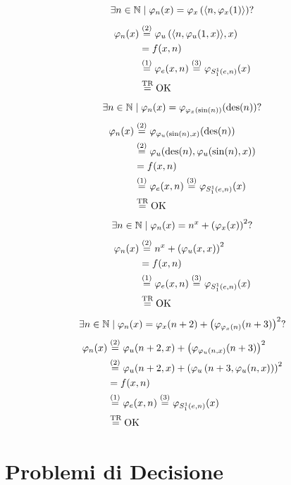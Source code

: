 $$ \exists n \in \mathbb{N} \mid \varphi_n (x) = \varphi_x \left(\langle n, \varphi_x (1) \rangle \right) ?$$
\begin{align*}
	\varphi_n (x) & \stackrel{(2)}{=} \varphi_u \left(\langle n, \varphi_u (1, x) \rangle, x\right) \\
	& = f(x,n) \\
	& \stackrel{(1)}{=} \varphi_e (x,n) \stackrel{(3)}{=} \varphi_{S_1^1 (e,n)} (x) \\
	& \stackrel{\text{TR}}{=} \text{OK}
\end{align*}
$$ \exists n \in \mathbb{N} \mid \varphi_n (x) = \varphi_{\varphi_x (\sin (n))} (\operatorname{des} (n)) ? $$
\begin{align*}
	\varphi_n (x) & \stackrel{(2)}{=} \varphi_{\varphi_u (\sin (n), x)} (\operatorname{des} (n)) \\
	& \stackrel{(2)}{=} \varphi_u (\operatorname{des} (n), \varphi_u (\sin (n), x)) \\
	& = f(x,n) \\
	& \stackrel{(1)}{=} \varphi_e (x,n) \stackrel{(3)}{=} \varphi_{S_1^1 (e,n)} (x) \\
	& \stackrel{\text{TR}}{=} \text{OK}
\end{align*}
$$ \exists n \in \mathbb{N} \mid \varphi_n (x) = n^x + \left(\varphi_x (x)\right)^2 ?$$
\begin{align*}
	\varphi_n (x) & \stackrel{(2)}{=} n^x + \left(\varphi_u (x,x)\right)^2 \\
	& = f(x,n) \\
	& \stackrel{(1)}{=} \varphi_e (x,n) \stackrel{(3)}{=} \varphi_{S_1^1 (e,n)} (x) \\
	& \stackrel{\text{TR}}{=} \text{OK} \\
\end{align*}
$$ \exists n \in \mathbb{N} \mid \varphi_n (x) = \varphi_x (n + 2) + \left(\varphi_{\varphi_x (n)} (n+3)\right)^2 ? $$
\begin{align*}
	\varphi_n (x) & \stackrel{(2)}{=} \varphi_u (n + 2, x) + \left(\varphi_{\varphi_u (n, x)} (n + 3)\right)^2 \\
	& \stackrel{(2)}{=} \varphi_u (n+2, x) + \left(\varphi_u \left(n + 3, \varphi_u (n,x)\right)\right)^2  \\
	& = f(x,n) \\
	& \stackrel{(1)}{=} \varphi_e (x,n) \stackrel{(3)}{=} \varphi_{S_1^1 (e,n)} (x) \\
	& \stackrel{\text{TR}}{=} \text{OK}
\end{align*}


\section{Problemi di Decisione}

